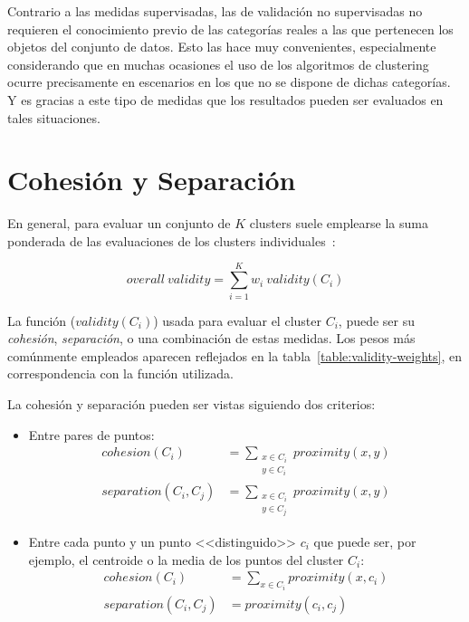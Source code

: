 Contrario a las medidas supervisadas, las de validación no supervisadas no requieren el conocimiento previo de las categorías reales a las que pertenecen los objetos del conjunto de datos.
Esto las hace muy convenientes, especialmente considerando que en muchas ocasiones el uso de los algoritmos de clustering ocurre precisamente en escenarios en los que no se dispone de dichas categorías.
Y es gracias a este tipo de medidas que los resultados pueden ser evaluados en tales situaciones.

\section{Cohesión y Separación}\label{sec:cohesiónYSeparación}

En general, para evaluar un conjunto de $K$ clusters suele emplearse la suma ponderada de las evaluaciones de los clusters individuales~\cite{Tan05}:

\begin{equation}
    \label{eq:overall-validity}
    overall\ validity = \sum_{i=1}^{K}{w_i\ validity(C_i)}
\end{equation}

La función ($validity(C_i)$) usada para evaluar el cluster $C_i$, puede ser su \textit{cohesión}, \textit{separación}, o una combinación de estas medidas.
Los pesos más comúnmente empleados aparecen reflejados en la tabla~\ref{table:validity-weights}, en correspondencia con la función utilizada.

La cohesión y separación pueden ser vistas siguiendo dos criterios:

\begin{itemize}
    \item Entre pares de puntos:
    \begin{align}
        cohesion(C_i) & = \sum_{\substack{x\in C_i \\ y\in C_i}}{proximity(x,y)} \\
        separation(C_i, C_j) & = \sum_{\substack{x\in C_i \\ y\in C_j}}{proximity(x,y)}
    \end{align}

    \item Entre cada punto y un punto <<distinguido>> $c_i$ que puede ser, por ejemplo, el centroide o la media de los puntos del cluster $C_i$:
    \begin{align}
        cohesion(C_i) & = \sum_{x\in C_i}{proximity(x,c_i)} \\
        separation(C_i, C_j) & = proximity(c_i,c_j)
    \end{align}
\end{itemize}

